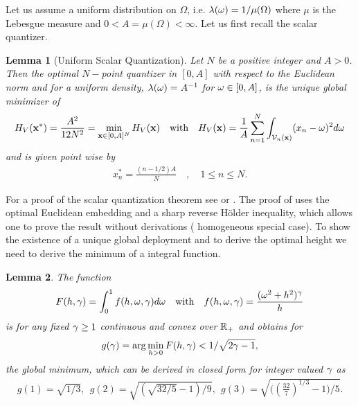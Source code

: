 \documentclass[smallabstract,smallcaptions]{dccpaper}
\newtheorem{lemma}{Lemma}
\newif\ifproof\prooffalse %
\newcommand{\df}{\ensuremath{\lam}}         %
\newcommand{\Vor}{\ensuremath{\mathcal{V}}}         %
\begin{document}
Let us assume a uniform
distribution on $\Omega$, i.e.  $\df(\ome)=1/\mu(\Omega)$ where $\mu$ is the Lebesgue measure and
$0<A=\mu(\Omega)<\infty$. 
%
Let us first recall the scalar quantizer.
%
\begin{lemma}[Uniform Scalar Quantization]\label{lem:UniformScalarQuantizer}
  Let $N$ be a positive integer and $A>0$. Then the optimal $N-$point quantizer in $[0,A]$ with respect to the
  Euclidean norm and for a uniform density, $\lambda(\omega)=A^{-1}$ for $\omega\in[0,A]$,  is the unique global minimizer of
  \begin{align}
    H_V(\vx^*)=\frac{A^2}{12N^2}=\min_{\vx\in[0,A]^N} H_V(\vx) 
       \quad\text{with}\quad H_V(\vx)=\frac{1}{A}\sum_{n=1}^N \int_{\Vor_n(\vx)} (x_n-\ome)^2d\ome
  \end{align}
  and is given point wise by
  \begin{align}
    x_n^*= \frac{(n-1/2)A}{N} \quad, \quad 1\leq n\leq N.
  \end{align}
\end{lemma}
%
For a proof of the scalar quantization theorem see \cite{GN98} or
  \cite{Erdem}.  The proof of \cite[Thm.1]{Erdem} uses the optimal
  Euclidean  embedding and a sharp reverse Hölder inequality, which allows one to prove the result without derivations (
  homogeneous special case). 
\fi
%
To show the existence of a unique global deployment and to derive the optimal height we need to derive the minimum of a
integral function. 
%
\begin{lemma}\label{lem:ggam}
  The function 
  \begin{align}
    F(h,\gamma)=\int_0^1  f(h,\omega,\gamma) d\omega \quad\text{with}\quad f(h,\omega,\gamma)=\frac{(\omega^2+h^2)^{\gamma}}{h} 
  \end{align}
  is for any fixed $\gamma\geq 1$ continuous and convex over ${\mathbb R}_+$ and obtains for 
  \begin{align}
    g(\gamma)=\arg\min_{h>0} F(h,\gamma)<1/\sqrt{2\gamma-1},
  \end{align}
  the global minimum, which can be derived in closed form for integer valued $\gamma$ as 
  \begin{align}
    g(1) = \sqrt{1/3},\ \  g(2) = \sqrt{ (\sqrt{32/5}-1)/9}, 
    \ \  g(3) = \sqrt{\Big((\frac{32}{7})^{1/3}-1\Big)/5}.\label{eq:ggam}
 \end{align}
\end{lemma}
%
\ifproof
\end{document}

